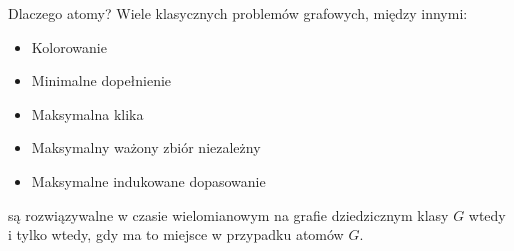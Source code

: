 \documentclass[polish]{beamer}
\begin{document}
\begin{frame}{Dlaczego atomy?}
    Wiele klasycznych problemów grafowych, między innymi:
    \begin{itemize}
        \item Kolorowanie
        \item Minimalne dopełnienie
        \item Maksymalna klika
        \item Maksymalny ważony zbiór niezależny
        \item Maksymalne indukowane dopasowanie
    \end{itemize}    
    są rozwiązywalne w czasie wielomianowym na grafie dziedzicznym klasy $G$ wtedy i tylko wtedy, gdy ma to miejsce w przypadku atomów $G$.
\end{frame}
\end{document}
